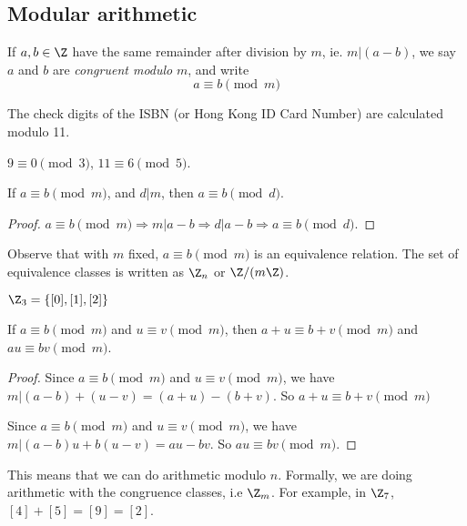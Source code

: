 \documentclass[a4paper]{article}
\begin{document}
\subsection{Modular arithmetic}
\begin{defi}[Modulo]
  If $a, b\in \Z$ have the same remainder after division by $m$, ie. $m | (a - b)$, we say $a$ and $b$ are \emph{congruent modulo} $m$, and write
  \[
    a\equiv b\pmod m
  \]
\end{defi}

\begin{eg}
  The check digits of the ISBN (or Hong Kong ID Card Number) are calculated modulo 11.
\end{eg}

\begin{eg}
  $9 \equiv 0\pmod 3$, $11\equiv 6\pmod 5$.
\end{eg}

\begin{prop}
  If $a\equiv b\pmod m$, and $d | m$, then $a \equiv b\pmod d$.
\end{prop}

\begin{proof}
  $a\equiv b\pmod m \Rightarrow m | a - b \Rightarrow d | a - b \Rightarrow a \equiv b\pmod d$.
\end{proof}

Observe that with $m$ fixed, $a\equiv b\pmod m$ is an equivalence relation. The set of equivalence classes is written as $\Z_n$ or $\Z/(m\Z)$.

\begin{eg}
  $\Z_3 = \{[0], [1], [2]\}$
\end{eg}

\begin{prop}
  If $a\equiv b\pmod m$ and $u\equiv v \pmod m$, then $a + u\equiv b + v\pmod m$ and $au \equiv bv \pmod m$.
\end{prop}

\begin{proof}
  Since $a\equiv b\pmod m$ and $u\equiv v \pmod m$, we have $m | (a - b) + (u - v) = (a + u) - (b + v)$. So $a + u\equiv b + v\pmod m$

  Since $a\equiv b\pmod m$ and $u\equiv v \pmod m$, we have $m | (a - b)u + b(u - v) = au - bv$. So $au \equiv bv \pmod m$.
\end{proof}

This means that we can do arithmetic modulo $n$. Formally, we are doing arithmetic with the congruence classes, i.e $\Z_m$. For example, in $\Z_7$, $[4] + [5] = [9] = [2]$.
\end{document}
